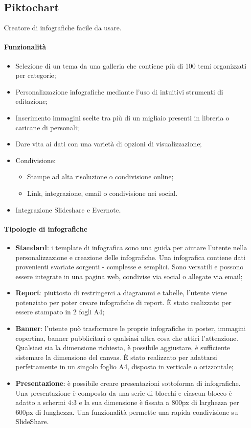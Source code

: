 \subsection{Piktochart}
Creatore di infografiche facile da usare.

\paragraph{Funzionalità}
\begin{itemize}
\item Selezione di un tema da una galleria che contiene più di 100 temi organizzati per categorie;
\item Personalizzazione infografiche mediante l'uso di intuitivi strumenti di editazione;
\item Inserimento immagini scelte tra più di un migliaio presenti in libreria o caricane di personali;
\item Dare vita ai dati con una varietà di opzioni di visualizzazione;
\item Condivisione:
 \begin{itemize}
 \item Stampe ad alta risoluzione o condivisione online;
 \item Link, integrazione, email o condivisione nei social.
 \end{itemize}
\item Integrazione Slideshare e Evernote.
\end{itemize}

\paragraph{Tipologie di infografiche}
\begin{itemize}
\item \textbf{Standard}:
i template di infografica sono una guida per aiutare l'utente nella personalizzazione e creazione delle infografiche.
Una infografica contiene dati provenienti svariate sorgenti - complesse e semplici. 
Sono versatili e possono essere integrate in una pagina web, condivise via social o allegate via email;
\item \textbf{Report}:
piuttosto di restringerci a diagrammi e tabelle, l'utente viene potenziato per poter creare infografiche di report.
\`E stato realizzato per essere stampato in 2 fogli A4;
\item \textbf{Banner}:
l'utente può trasformare le proprie infografiche in poster, immagini copertina, banner pubblicitari o qualsiasi altra cosa che attiri l'attenzione.
Qualsiasi sia la dimensione richiesta, è possibile aggiustare, è sufficiente sistemare la dimensione del canvas. 
\`E stato realizzato per adattarsi perfettamente in un singolo foglio A4, disposto in verticale o orizzontale;
\item \textbf{Presentazione}:
è possibile creare presentazioni sottoforma di infografiche.
Una presentazione è composta da una serie di blocchi e ciascun blocco è adatto a schermi 4:3 e la sua dimensione è fissata a 800px di larghezza per 600px di lunghezza.
Una funzionalità permette una rapida condivisione su SlideShare.
\end{itemize}

